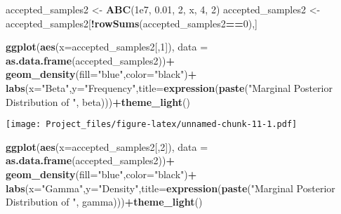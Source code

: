 \documentclass[
]{article}
\newenvironment{Shaded}{\begin{snugshade}}{\end{snugshade}}
\newcommand{\AttributeTok}[1]{\textcolor[rgb]{0.13,0.29,0.53}{#1}}
\newcommand{\DecValTok}[1]{\textcolor[rgb]{0.00,0.00,0.81}{#1}}
\newcommand{\FloatTok}[1]{\textcolor[rgb]{0.00,0.00,0.81}{#1}}
\newcommand{\FunctionTok}[1]{\textcolor[rgb]{0.13,0.29,0.53}{\textbf{#1}}}
\newcommand{\NormalTok}[1]{#1}
\newcommand{\OtherTok}[1]{\textcolor[rgb]{0.56,0.35,0.01}{#1}}
\newcommand{\SpecialCharTok}[1]{\textcolor[rgb]{0.81,0.36,0.00}{\textbf{#1}}}
\newcommand{\StringTok}[1]{\textcolor[rgb]{0.31,0.60,0.02}{#1}}
\begin{document}
\begin{Shaded}
\begin{Highlighting}[]
\NormalTok{accepted\_samples2 }\OtherTok{\textless{}{-}} \FunctionTok{ABC}\NormalTok{(}\FloatTok{1e7}\NormalTok{, }\FloatTok{0.01}\NormalTok{, }\DecValTok{2}\NormalTok{, x, }\DecValTok{4}\NormalTok{, }\DecValTok{2}\NormalTok{)}
\NormalTok{accepted\_samples2 }\OtherTok{\textless{}{-}}\NormalTok{ accepted\_samples2[}\SpecialCharTok{!}\FunctionTok{rowSums}\NormalTok{(accepted\_samples2}\SpecialCharTok{==}\DecValTok{0}\NormalTok{),]}
\end{Highlighting}
\end{Shaded}

\begin{Shaded}
\begin{Highlighting}[]
\FunctionTok{ggplot}\NormalTok{(}\FunctionTok{aes}\NormalTok{(}\AttributeTok{x=}\NormalTok{accepted\_samples2[,}\DecValTok{1}\NormalTok{]), }\AttributeTok{data =} \FunctionTok{as.data.frame}\NormalTok{(accepted\_samples2))}\SpecialCharTok{+}
  \FunctionTok{geom\_density}\NormalTok{(}\AttributeTok{fill=}\StringTok{"blue"}\NormalTok{,}\AttributeTok{color=}\StringTok{"black"}\NormalTok{)}\SpecialCharTok{+}
  \FunctionTok{labs}\NormalTok{(}\AttributeTok{x=}\StringTok{"Beta"}\NormalTok{,}\AttributeTok{y=}\StringTok{"Frequency"}\NormalTok{,}\AttributeTok{title=}\FunctionTok{expression}\NormalTok{(}\FunctionTok{paste}\NormalTok{(}\StringTok{"Marginal Posterior Distribution of "}\NormalTok{, beta)))}\SpecialCharTok{+}\FunctionTok{theme\_light}\NormalTok{()}
\end{Highlighting}
\end{Shaded}

\texttt{[image: Project\_files/figure-latex/unnamed-chunk-11-1.pdf]}

\begin{Shaded}
\begin{Highlighting}[]
\FunctionTok{ggplot}\NormalTok{(}\FunctionTok{aes}\NormalTok{(}\AttributeTok{x=}\NormalTok{accepted\_samples2[,}\DecValTok{2}\NormalTok{]), }\AttributeTok{data =} \FunctionTok{as.data.frame}\NormalTok{(accepted\_samples2))}\SpecialCharTok{+}
  \FunctionTok{geom\_density}\NormalTok{(}\AttributeTok{fill=}\StringTok{"blue"}\NormalTok{,}\AttributeTok{color=}\StringTok{"black"}\NormalTok{)}\SpecialCharTok{+}
  \FunctionTok{labs}\NormalTok{(}\AttributeTok{x=}\StringTok{"Gamma"}\NormalTok{,}\AttributeTok{y=}\StringTok{"Density"}\NormalTok{,}\AttributeTok{title=}\FunctionTok{expression}\NormalTok{(}\FunctionTok{paste}\NormalTok{(}\StringTok{"Marginal Posterior Distribution of "}\NormalTok{, gamma)))}\SpecialCharTok{+}\FunctionTok{theme\_light}\NormalTok{()}
\end{Highlighting}
\end{Shaded}
\end{document}
